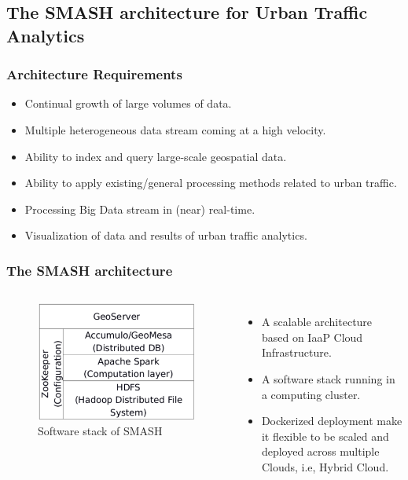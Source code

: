 \subsection{The SMASH architecture for Urban Traffic Analytics}
\begin{frame}
    \frametitle{Architecture Requirements}
    \begin{itemize}
	    \item Continual growth of large volumes of data.
	    \item Multiple heterogeneous data stream coming at a high velocity.
	    \item Ability to index and query large-scale geospatial data.
	    \item Ability to apply existing/general processing methods related to urban traffic.
	    \item Processing Big Data stream in (near) real-time. 
	    \item Visualization of data and results of urban traffic analytics.
    \end{itemize}
\end{frame}

\begin{frame}
    \frametitle{The SMASH architecture}
    \begin{columns}
             \begin{figure}
                 \centering
                 \includegraphics[width=\textwidth]{resource/figures/smash_architecture.png}
                 \caption{Software stack of SMASH}
             \end{figure}
              \begin{itemize}
                \item A scalable architecture based on IaaP Cloud Infrastructure.
                \item A software stack running in a computing cluster.
                \item Dockerized deployment make it flexible to be scaled and deployed across multiple Clouds, i.e, Hybrid Cloud.
              \end{itemize}
    \end{columns}
\end{frame}

